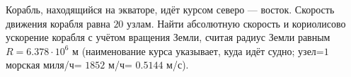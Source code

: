 Корабль, находящийся на экваторе, идёт курсом северо --- восток.
Скорость движения корабля равна $20$ узлам. Найти абсолютную скорость и
кориолисово ускорение корабля с учётом вращения Земли, считая радиус
Земли равным $R=6.378\cdot10^6$ м (наименование курса указывает, куда
идёт судно; узел=$1$ морская миля/ч= $1852$ м/ч= $0.5144$ м/с).
